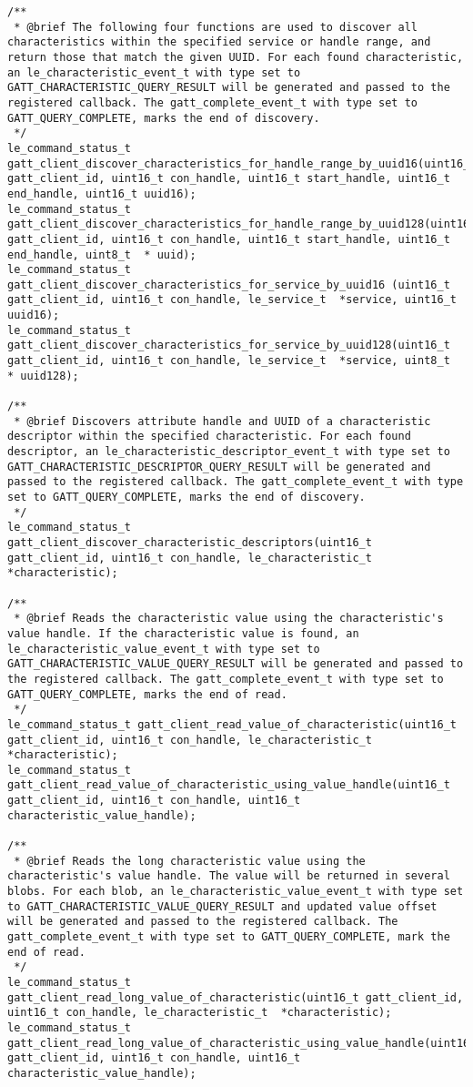 \begin{lstlisting}
/** 
 * @brief The following four functions are used to discover all characteristics within the specified service or handle range, and return those that match the given UUID. For each found characteristic, an le_characteristic_event_t with type set to GATT_CHARACTERISTIC_QUERY_RESULT will be generated and passed to the registered callback. The gatt_complete_event_t with type set to GATT_QUERY_COMPLETE, marks the end of discovery.
 */
le_command_status_t gatt_client_discover_characteristics_for_handle_range_by_uuid16(uint16_t gatt_client_id, uint16_t con_handle, uint16_t start_handle, uint16_t end_handle, uint16_t uuid16);
le_command_status_t gatt_client_discover_characteristics_for_handle_range_by_uuid128(uint16_t gatt_client_id, uint16_t con_handle, uint16_t start_handle, uint16_t end_handle, uint8_t  * uuid);
le_command_status_t gatt_client_discover_characteristics_for_service_by_uuid16 (uint16_t gatt_client_id, uint16_t con_handle, le_service_t  *service, uint16_t  uuid16);
le_command_status_t gatt_client_discover_characteristics_for_service_by_uuid128(uint16_t gatt_client_id, uint16_t con_handle, le_service_t  *service, uint8_t  * uuid128);

/** 
 * @brief Discovers attribute handle and UUID of a characteristic descriptor within the specified characteristic. For each found descriptor, an le_characteristic_descriptor_event_t with type set to GATT_CHARACTERISTIC_DESCRIPTOR_QUERY_RESULT will be generated and passed to the registered callback. The gatt_complete_event_t with type set to GATT_QUERY_COMPLETE, marks the end of discovery.
 */
le_command_status_t gatt_client_discover_characteristic_descriptors(uint16_t gatt_client_id, uint16_t con_handle, le_characteristic_t  *characteristic);

/** 
 * @brief Reads the characteristic value using the characteristic's value handle. If the characteristic value is found, an le_characteristic_value_event_t with type set to GATT_CHARACTERISTIC_VALUE_QUERY_RESULT will be generated and passed to the registered callback. The gatt_complete_event_t with type set to GATT_QUERY_COMPLETE, marks the end of read.
 */
le_command_status_t gatt_client_read_value_of_characteristic(uint16_t gatt_client_id, uint16_t con_handle, le_characteristic_t  *characteristic);
le_command_status_t gatt_client_read_value_of_characteristic_using_value_handle(uint16_t gatt_client_id, uint16_t con_handle, uint16_t characteristic_value_handle);

/** 
 * @brief Reads the long characteristic value using the characteristic's value handle. The value will be returned in several blobs. For each blob, an le_characteristic_value_event_t with type set to GATT_CHARACTERISTIC_VALUE_QUERY_RESULT and updated value offset will be generated and passed to the registered callback. The gatt_complete_event_t with type set to GATT_QUERY_COMPLETE, mark the end of read.
 */
le_command_status_t gatt_client_read_long_value_of_characteristic(uint16_t gatt_client_id, uint16_t con_handle, le_characteristic_t  *characteristic);
le_command_status_t gatt_client_read_long_value_of_characteristic_using_value_handle(uint16_t gatt_client_id, uint16_t con_handle, uint16_t characteristic_value_handle);


\end{lstlisting}
